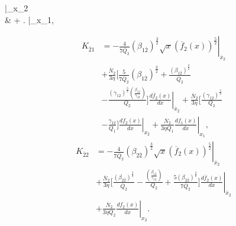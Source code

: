 \documentclass[preprint,12pt]{elsarticle}
\begin{document}
\right|_{x_2} \\ & + \left.   \right|_{x_1},
            
            \begin{equation}
                \begin{split}
                    K_{\overline{2}1}  &= -  \left.\frac{4}{7\overline{Q}_{2}} (\beta_{1\overline{2}})^\frac{3}{2} \sqrt{x} (\overline{f}_{2}(x))^\frac{5}{2} \right|_{\overline{x}_{2}} \\ & + \frac{\overline{N}_{2}}{3 \eta} \Biggl[ \frac{5}{7 \overline{Q}_{2}} (\beta_{1\overline{2}})^\frac{3}{2}+ \frac{(\beta_{1\overline{2}})^\frac{3}{2}}{\overline{Q}_{2}} \\ & - \frac{(\gamma_{12})^\frac{3}{2} \left(\frac{\beta_{1\overline{2}}}{\gamma_{12}}\right)}{Q_{2}} \Biggr] \left. \frac{d\overline{f}_{2}(x)}{dx}\right|_{\overline{x}_{2}}   +   \frac{\overline{N}_{2}}{3 \eta}  \Biggl[\frac{(\gamma_{12})^\frac{3}{2}}{Q_2} \\ & - \left. \frac{\gamma_{12}}{Q_1} \Biggr] \frac{df_2(x)}{dx} \right|_{x_2}  + \left. \frac{\overline{N}_{2}}{3 \eta Q_1} \frac{df_1(x)}{dx} \right|_{x_1},
                \end{split}
            \label{eqn:k2bar1_caseI}
            \end{equation}       
            \begin{equation}
            \begin{split}
            K_{\overline{2}2} &= - \left. \frac{4}{7\overline{Q}_{2}}(\beta_{2\overline{2}})^\frac{3}{2}\sqrt{x}(\overline{f}_{2}(x))^\frac{5}{2}\right|_{\overline{x}_{2}} \\ & +\frac{\overline{N}_{2}}{3\eta} \biggl[\frac{(\beta_{2\overline{2}})^\frac{3}{2}}{\overline{Q}_{2}}-\frac{\left(\frac{\beta_{1\overline{2}}}{\gamma_{12}}\right)}{Q_2} +\left. \frac{5(\beta_{2\overline{2}})^\frac{3}{2}}{7\overline{Q}_{2}}\biggr]\frac{d\overline{f}_{2}(x)}{dx}\right|_{\overline{x}_{2}} \\ & + \left. \frac{\overline{N}_{2}}{3\eta Q_2} \frac{df_2(x)}{dx}\right|_{x_2}.
            \label{eqn:k2bar2_caseI}
            \end{split}
            \end{equation} 
\label{app1}








            
\end{document}

